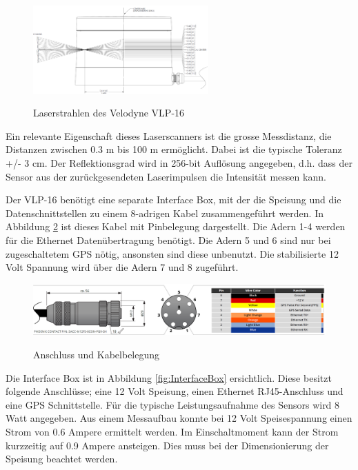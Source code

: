 \begin{figure}[H]
	\centering
	\includegraphics[width=0.6\textwidth]
	{resources/velodyne_channels.PNG}
	\caption[Laserstrahlen des Velodyne  VLP-16]{Laserstrahlen des Velodyne  VLP-16} \protect\cite{velodyne}
	\label{fig:angleVLP}
\end{figure}

Ein relevante Eigenschaft dieses Laserscanners ist die grosse Messdistanz, die Distanzen zwischen 0.3 m bis 100 m ermöglicht. Dabei ist die typische Toleranz +/- 3 cm. Der Reflektionsgrad wird in 256-bit Auflösung angegeben, d.h. dass der Sensor aus der zurückgesendeten Laserimpulsen die Intensität messen kann.

Der VLP-16 benötigt eine separate Interface Box, mit der die Speisung und die Datenschnittstellen zu einem 8-adrigen Kabel zusammengeführt werden. In Abbildung \ref{fig:CablePin} ist dieses Kabel mit Pinbelegung dargestellt. Die Adern 1-4 werden für die Ethernet Datenübertragung benötigt. Die Adern 5 und 6 sind nur bei zugeschaltetem \ac{GPS} nötig, ansonsten sind diese unbenutzt. Die stabilisierte 12 Volt Spannung wird über die Adern 7 und 8 zugeführt.

\begin{figure}[H]
	\centering
	\includegraphics[width=1\textwidth]{resources/Cablepins.PNG}
	\caption[Anschluss und Kabelbelegung]{Anschluss und Kabelbelegung}\protect\cite{velodyne}
	\label{fig:CablePin}
\end{figure} 

Die Interface Box ist in Abbildung \ref{fig:InterfaceBox} ersichtlich. Diese besitzt folgende Anschlüsse; eine 12 Volt Speisung, einen Ethernet RJ45-Anschluss und eine \ac{GPS} Schnittstelle. Für die typische Leistungsaufnahme des Sensors wird 8 Watt angegeben. Aus einem Messaufbau konnte bei 12 Volt Speisespannung einen Strom von 0.6 Ampere ermittelt werden. Im Einschaltmoment kann der Strom kurzzeitig auf 0.9 Ampere ansteigen. Dies muss bei der Dimensionierung der Speisung beachtet werden.  

